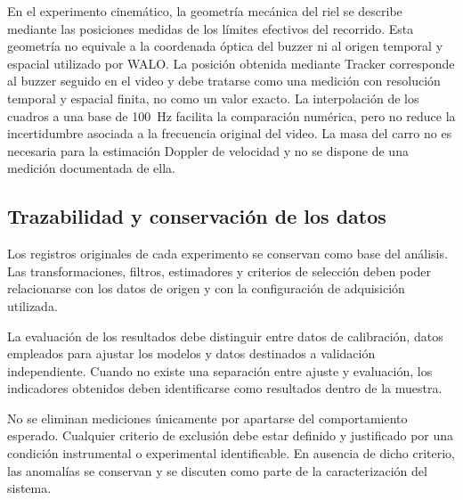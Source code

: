 En el experimento cinemático, la geometría
mecánica del riel se describe mediante las
posiciones medidas de los límites efectivos
del recorrido. Esta geometría no equivale a
la coordenada óptica del buzzer ni al origen
temporal y espacial utilizado por WALO. La
posición obtenida mediante Tracker corresponde
al buzzer seguido en el video y debe tratarse
como una medición con resolución temporal y
espacial finita, no como un valor exacto. La
interpolación de los cuadros a una base de
\SI{100}{\hertz} facilita la comparación
numérica, pero no reduce la incertidumbre
asociada a la frecuencia original del video.
La masa del carro no es necesaria para la
estimación Doppler de velocidad y no se
dispone de una medición documentada de ella.

\subsection{Trazabilidad y conservación de los datos}

Los registros originales de cada experimento
se conservan como base del análisis. Las
transformaciones, filtros, estimadores y
criterios de selección deben poder relacionarse
con los datos de origen y con la configuración
de adquisición utilizada.

La evaluación de los resultados debe distinguir
entre datos de calibración, datos empleados
para ajustar los modelos y datos destinados
a validación independiente. Cuando no existe
una separación entre ajuste y evaluación,
los indicadores obtenidos deben identificarse
como resultados dentro de la muestra.

No se eliminan mediciones únicamente por
apartarse del comportamiento esperado. Cualquier
criterio de exclusión debe estar definido y
justificado por una condición instrumental
o experimental identificable. En ausencia
de dicho criterio, las anomalías se conservan
y se discuten como parte de la caracterización
del sistema.
